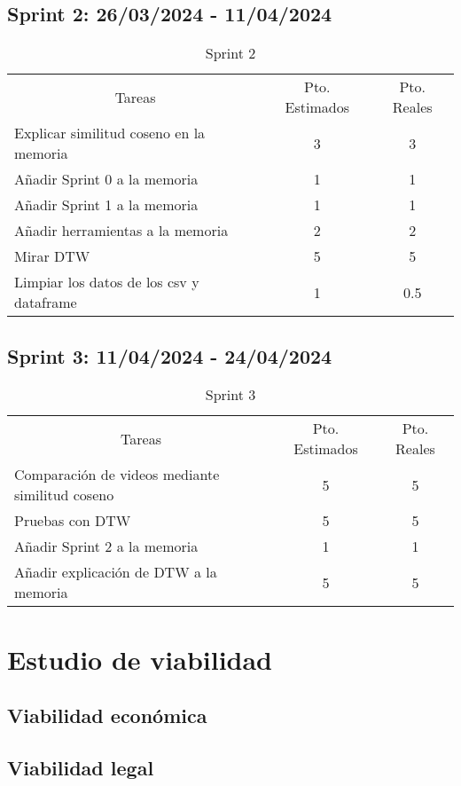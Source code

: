 \subsection{Sprint 2: 26/03/2024 - 11/04/2024}
\begin{table}[H]
	\begin{tabular}{lcc}
		\multicolumn{1}{c}{Tareas} & Pto. Estimados & Pto. Reales\\
		Explicar similitud coseno en la memoria & 3 & 3 \\
		Añadir Sprint 0 a la memoria & 1 & 1 \\
		Añadir Sprint 1 a la memoria & 1 & 1 \\
		Añadir herramientas a la memoria & 2 & 2 \\
		Mirar DTW & 5 & 5 \\
		Limpiar los datos de los csv y dataframe & 1 & 0.5 \\

	\end{tabular}
	\caption{Sprint 2}
	\label{sprint2}
\end{table}

\subsection{Sprint 3: 11/04/2024 - 24/04/2024}
\begin{table}[H]
	\begin{tabular}{lcc}
		\multicolumn{1}{c}{Tareas} & Pto. Estimados & Pto. Reales\\
		Comparación de videos mediante similitud coseno & 5 & 5 \\
		Pruebas con DTW & 5 & 5 \\
		Añadir Sprint 2 a la memoria & 1 & 1 \\
		Añadir explicación de DTW a la memoria & 5 & 5 \\
	\end{tabular}
	\caption{Sprint 3}
	\label{sprint3}
\end{table}

\section{Estudio de viabilidad}

\subsection{Viabilidad económica}

\subsection{Viabilidad legal}


